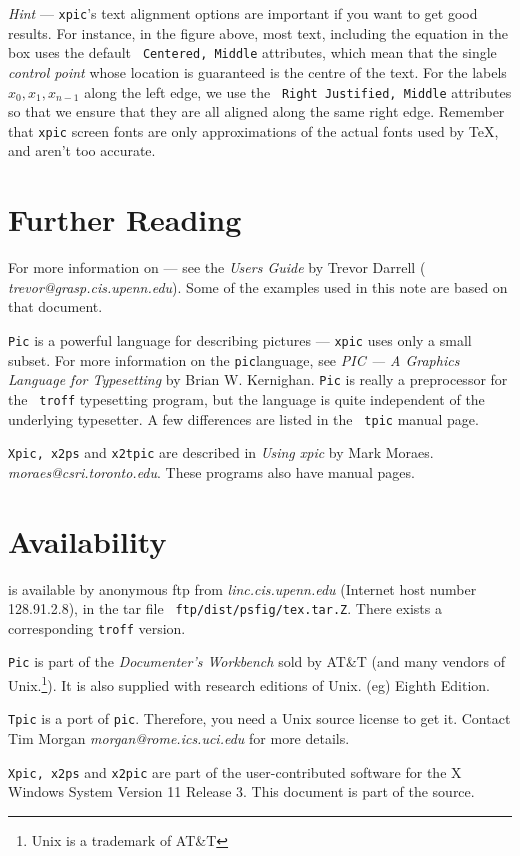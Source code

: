 \par
{\small {\em Hint} --- {\tt xpic}'s text alignment options are
important if you want to get good results. For instance, in the figure
above, most text, including the equation in the box uses the default {\tt
Centered, Middle} attributes, which mean that the single {\em control
point} whose location is guaranteed is the centre of the text. For the
labels $ x_{0}, x_{1}, x_{n-1} $ along the left edge, we use the {\tt
Right Justified, Middle} attributes so that we ensure that they are all
aligned along the same right edge. Remember that {\tt xpic} screen
fonts are only approximations of the actual fonts used by \TeX, and
aren't too accurate.}
\section{Further Reading}
For more information on \psfigtex --- see the {\em
{} Users Guide} by Trevor Darrell ({\em
trevor@grasp.cis.upenn.edu}). Some of
the examples used in this note are based on that document.

{\tt Pic} is a powerful language for describing pictures --- {\tt xpic}
uses only a small subset. For more information on the {\tt pic}language, see {\em PIC --- A Graphics Language for Typesetting} by
Brian W. Kernighan. {\tt Pic} is really a preprocessor for the {\tt
troff} typesetting program, but the language is quite independent of
the underlying typesetter. A few differences are listed in the {\tt
tpic} manual page.

{\tt Xpic, x2ps} and {\tt x2tpic} are described in {\em Using xpic} by
Mark Moraes. {\em moraes@csri.toronto.edu}. These programs also have
manual pages.

\section{Availability}
\psfigtex is available by anonymous ftp from {\em linc.cis.upenn.edu}
(Internet host number 128.91.2.8), in the tar file
{\tt ~ftp/dist/psfig/tex.tar.Z}. There exists a corresponding {\tt troff}
version.

{\tt Pic} is part of the {\em Documenter's Workbench} sold by AT\&T
(and many vendors of Unix.\footnote{Unix is a trademark of AT\&T}). It
is also supplied with research editions of Unix. (eg) Eighth Edition.

{\tt Tpic} is a port of {\tt pic}. Therefore, you need a Unix source
license to get it. Contact Tim Morgan {\em morgan@rome.ics.uci.edu}
for more details.

{\tt Xpic, x2ps} and {\tt x2pic} are part of the user-contributed
software for the X Windows System Version 11 Release 3.  This document
is part of the source.

